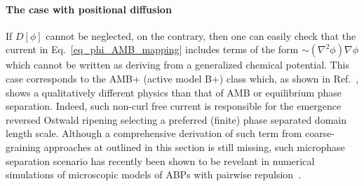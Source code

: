 \paragraph{The case with positional diffusion}
If $D[\phi]$ cannot be neglected, on the contrary, then one can easily check that the current in Eq.~\eqref{eq_phi_AMB_mapping} includes terms of the form $\sim (\nabla^2\phi)\nabla\phi$ which cannot be written as deriving from a generalized chemical potential. This case corresponds to the AMB+ (active model B+) class which, as shown in Ref.~\cite{Tjhung2018PRX}, shows a qualitatively different physics than that of AMB or equilibrium phase separation.
Indeed, such non-curl free current is responsible for the emergence reversed Ostwald ripening selecting a preferred (finite) phase separated domain length scale.
Although a comprehensive derivation of such term from coarse-graining approaches at outlined in this section is still missing, such microphase separation scenario has recently been shown to be revelant in numerical simulations of microscopic models of ABPs with pairwise repulsion~\cite{Caporusso2020MIPS,Shi2020bubbles}. 


